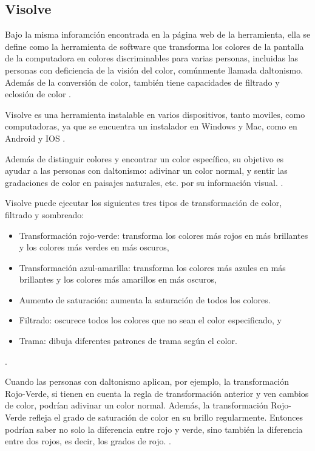 \documentclass[10pt]{article}
\begin{document}
\subsection{Visolve}

Bajo la misma inforamción encontrada en la página web de la herramienta, ella se define como la herramienta de software que transforma los colores de la pantalla de la computadora en colores discriminables para varias personas, incluidas las personas con deficiencia de la visión del color, comúnmente llamada daltonismo. Además de la conversión de color, también tiene capacidades de filtrado y eclosión de color \cite{IEEEreferencias:Ref20}.

\setlength{\parskip}{2mm}

Visolve es una herramienta instalable en varios dispositivos, tanto moviles, como computadoras, ya que se encuentra un instalador en Windows y Mac, como en Android y IOS \cite{IEEEreferencias:Ref20}.

\setlength{\parskip}{2mm}

Además de distinguir colores y encontrar un color específico, su objetivo es ayudar a las personas con daltonismo: adivinar un color normal, y sentir las gradaciones de color en paisajes naturales, etc. por su información visual.
\cite{IEEEreferencias:Ref20}.

\setlength{\parskip}{2mm}

Visolve puede ejecutar los siguientes tres tipos de transformación de color, filtrado y sombreado:

\begin{itemize}
    \item Transformación rojo-verde: transforma los colores más rojos en más brillantes y los colores más verdes en más oscuros,
    \item Transformación azul-amarilla: transforma los colores más azules en más brillantes y los colores más amarillos en más oscuros,
    \item Aumento de saturación: aumenta la saturación de todos los colores.
    \item Filtrado: oscurece todos los colores que no sean el color especificado, y
    \item Trama: dibuja diferentes patrones de trama según el color.
\end{itemize}
\cite{IEEEreferencias:Ref20}.

Cuando las personas con daltonismo aplican, por ejemplo, la transformación Rojo-Verde, si tienen en cuenta la regla de transformación anterior y ven cambios de color, podrían adivinar un color normal. Además, la transformación Rojo-Verde refleja el grado de saturación de color en su brillo regularmente. Entonces podrían saber no solo la diferencia entre rojo y verde, sino también la diferencia entre dos rojos, es decir, los grados de rojo.
\cite{IEEEreferencias:Ref20}.
\end{document}
